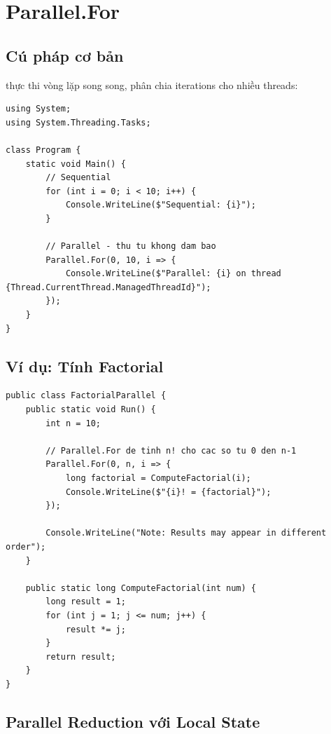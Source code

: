 \section{Parallel.For}

\subsection{Cú pháp cơ bản}

 thực thi vòng lặp song song, phân chia iterations cho nhiều threads:

\begin{lstlisting}[style=csharpstyle, caption={Parallel.For cơ bản}, label={lst:parallel_for_basic}]
using System;
using System.Threading.Tasks;

class Program {
    static void Main() {
        // Sequential
        for (int i = 0; i < 10; i++) {
            Console.WriteLine($"Sequential: {i}");
        }
        
        // Parallel - thu tu khong dam bao
        Parallel.For(0, 10, i => {
            Console.WriteLine($"Parallel: {i} on thread {Thread.CurrentThread.ManagedThreadId}");
        });
    }
}
\end{lstlisting}

\subsection{Ví dụ: Tính Factorial}

\begin{lstlisting}[style=csharpstyle, caption={Tính Factorial với Parallel.For}, label={lst:factorial_parallel}]
public class FactorialParallel {
    public static void Run() {
        int n = 10;
        
        // Parallel.For de tinh n! cho cac so tu 0 den n-1
        Parallel.For(0, n, i => {
            long factorial = ComputeFactorial(i);
            Console.WriteLine($"{i}! = {factorial}");
        });
        
        Console.WriteLine("Note: Results may appear in different order");
    }
    
    public static long ComputeFactorial(int num) {
        long result = 1;
        for (int j = 1; j <= num; j++) {
            result *= j;
        }
        return result;
    }
}
\end{lstlisting}

\subsection{Parallel Reduction với Local State}


